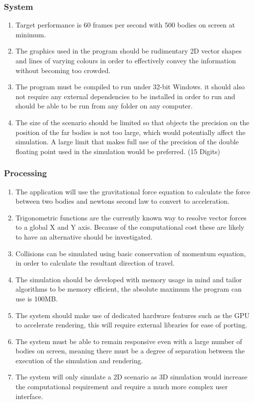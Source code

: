 \subsubsection{System}
\begin{enumerate}
\item Target performance is 60 frames per second with 500 bodies on screen at minimum.
\item The graphics used in the program should be rudimentary 2D vector shapes and lines of varying colours in order to effectively convey the information without becoming too crowded.
\item The program must be compiled to run under 32-bit Windows. it should also not require any external dependencies to be installed in order to run and should be able to be run from any folder on any computer.
\item The size of the scenario should be limited so that objects the precision on the position of the far bodies is not too large, which would potentially affect the simulation. A large limit that makes full use of the precision of the double floating point used in the simulation would be preferred. (15 Digits)
\end{enumerate}

\subsubsection{Processing}
\begin{enumerate}
\item The application will use the gravitational force equation to calculate the force between two bodies and newtons second law to convert to acceleration.
\item Trigonometric functions are the currently known way to resolve vector forces to a global X and Y axis. Because of the computational cost these are likely to have an alternative should be investigated.
\item Collisions can be simulated using basic conservation of momentum equation, in order to calculate the resultant direction of travel.
\item The simulation should be developed with memory usage in mind and tailor algorithms to be memory efficient, the absolute maximum the program can use is 100MB.
\item The system should make use of dedicated hardware features such as the GPU to accelerate rendering, this will require external libraries for ease of porting.
\item The system must be able to remain responsive even with a large number of bodies on screen, meaning there must be a degree of separation between the execution of the simulation and rendering.
\item The system will only simulate a 2D scenario as 3D simulation would increase the computational requirement and require a much more complex user interface.
\end{enumerate}

